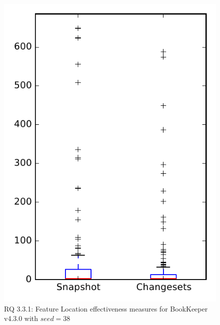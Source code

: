 
\begin{figure}
\centering
\includegraphics[height=0.4\textheight]{figures/flt_seed/rq1_bookkeeper_38}
\caption{RQ 3.3.1: Feature Location effectiveness measures for BookKeeper v4.3.0 with $seed=38$}
\label{fig:flt_seed:rq1:bookkeeper}
\end{figure}
